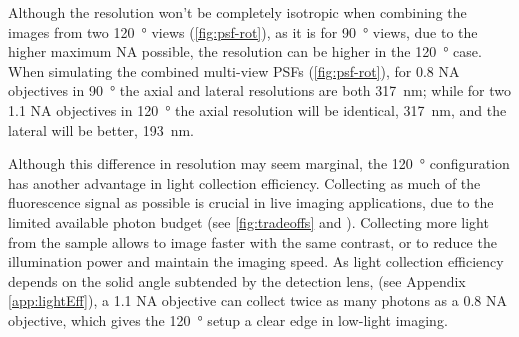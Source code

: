   Although the resolution won't be completely isotropic when combining the images from two \SI{120}{\degree} views (\autoref{fig:psf-rot}), as it is for \SI{90}{\degree} views, due to the higher maximum NA possible, the resolution can be higher in the \SI{120}{\degree} case. When simulating the combined multi-view PSFs (\autoref{fig:psf-rot}), for 0.8 NA objectives in \SI{90}{\degree} the axial and lateral resolutions are both \SI{317}{nm}; while for two 1.1 NA objectives in \SI{120}{\degree} the axial resolution will be identical, \SI{317}{nm}, and the lateral will be better, \SI{193}{nm}.
  
  Although this difference in resolution may seem marginal, the \SI{120}{\degree} configuration has another advantage in light collection efficiency. Collecting as much of the fluorescence signal as possible is crucial in live imaging applications, due to the limited available photon budget (see \autoref{fig:tradeoffs} and \cite{laissue_assessing_2017}). Collecting more light from the sample allows to image faster with the same contrast, or to reduce the illumination power and maintain the imaging speed. As light collection efficiency depends on the solid angle subtended by the detection lens, (see Appendix \autoref{app:lightEff}), a 1.1 NA objective can collect twice as many photons as a 0.8 NA objective, which gives the \SI{120}{\degree} setup a clear edge in low-light imaging.

